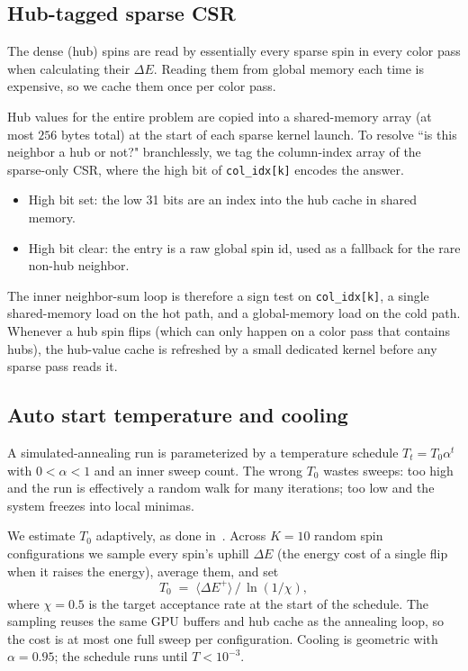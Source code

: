 \documentclass[pdflatex,sn-apa]{sn-jnl}%
\theoremstyle{thmstyleone}%
\theoremstyle{thmstyletwo}%
\theoremstyle{thmstylethree}%
\newcommand{\dE}{\Delta E}
\begin{document}
\begin{appendices}
\subsection{Hub-tagged sparse CSR}\label{sec:sa-hubs}

The dense (hub) spins are read by essentially every sparse spin in every color pass when calculating their $\dE$. Reading them from global memory each time is expensive, so we cache them once per color pass.

Hub values for the entire problem are copied into a shared-memory array (at most $256$ bytes total) at the start of each sparse kernel launch. To resolve ``is this neighbor a hub or not?" branchlessly, we tag the column-index array of the sparse-only CSR, where the high bit of \texttt{col\_idx[k]} encodes the answer.
\begin{itemize}
\item High bit set: the low 31 bits are an index into the hub cache in shared memory.
\item High bit clear: the entry is a raw global spin id, used as a fallback for the rare non-hub neighbor.
\end{itemize}
The inner neighbor-sum loop is therefore a sign test on \texttt{col\_idx[k]}, a single shared-memory load on the hot path, and a global-memory load on the cold path. Whenever a hub spin flips (which can only happen on a color pass that contains hubs), the hub-value cache is refreshed by a small dedicated kernel before any sparse pass reads it.

\subsection{Auto start temperature and cooling}\label{sec:sa-temp}

A simulated-annealing run is parameterized by a temperature schedule $T_t = T_0 \alpha^t$ with $0 < \alpha < 1$ and an inner sweep count. The wrong $T_0$ wastes sweeps: too high and the run is effectively a random walk for many iterations; too low and the system freezes into local minimas.

We estimate $T_0$ adaptively, as done in~\citep{BenAmeur2004}. Across $K = 10$ random spin configurations we sample every spin's uphill $\dE$ (the energy cost of a single flip when it raises the energy), average them, and set
\begin{equation}
  T_0 \;=\; \langle \dE^{+} \rangle \, / \, \ln(1 / \chi),
\end{equation}
where $\chi = 0.5$ is the target acceptance rate at the start of the schedule. The sampling reuses the same GPU buffers and hub cache as the annealing loop, so the cost is at most one full sweep per configuration. Cooling is geometric with $\alpha = 0.95$; the schedule runs until $T < 10^{-3}$.


\end{appendices}
\end{document}
